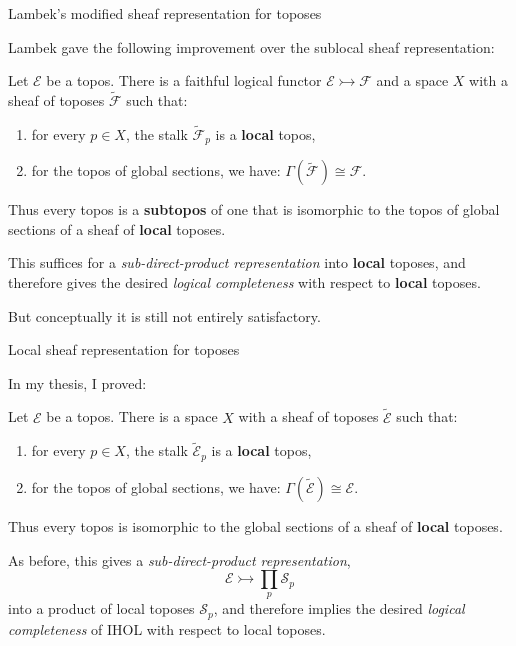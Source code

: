 \documentclass{beamer}
\newcommand{\E}{\ensuremath{\mathcal{E}}}
\newcommand{\myemph}[1]{\textbf{#1}}    %
\begin{document}
\begin{frame}{Lambek's modified sheaf representation for toposes}

Lambek gave the following improvement over the sublocal sheaf representation:

\begin{theorem}[Lambek 1989]
Let $\E$ be a topos.  
There is a faithful logical functor $\E\rightarrowtail\mathcal{F}$ 
and a space $X$ with a sheaf of toposes 
$\tilde{\mathcal{F}}$ such that:
\begin{enumerate}
\item for every $p\in X$, the stalk $\tilde{\mathcal{F}}_p$ is a \myemph{local} topos, 
\item for the topos of global sections, we have: $\Gamma(\tilde{\mathcal{F}}) \cong \mathcal{F}$.
\end{enumerate}
Thus every topos is a \myemph{subtopos} of one that is isomorphic to the topos of global sections of a sheaf of \myemph{local} toposes.  
\end{theorem}
\medskip

This suffices for a \emph{sub-direct-product representation} into \myemph{local} toposes, and therefore gives the desired \emph{logical completeness} with respect to \myemph{local} toposes.  

But conceptually it is still not entirely satisfactory.

\end{frame}
\begin{frame}{Local sheaf representation for toposes}

In my thesis, I proved:

\begin{theorem}[A. 1998]
Let $\E$ be a topos.  
There is a space $X$ with a sheaf of toposes $\tilde{\E}$ such that:
\begin{enumerate}
\item for every $p\in X$, the stalk $\tilde{\E}_p$ is a \myemph{local} topos, 
\item for the topos of global sections, we have: $\Gamma(\tilde{\E}) \cong \E$.
\end{enumerate}
Thus every topos is isomorphic to the global sections of a sheaf of \myemph{local} toposes.  
\end{theorem}
\medskip

As before, this gives a \emph{sub-direct-product representation},
\[
\E \rightarrowtail \prod_{p}\mathcal{S}_p
\]
into a product of local toposes $\mathcal{S}_p$, and therefore implies the desired \emph{logical completeness} of IHOL with respect to local toposes.  
\end{frame}
\end{document}
